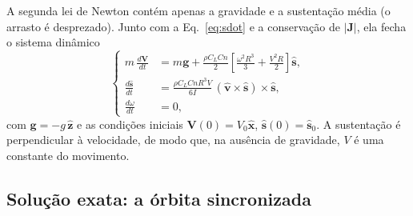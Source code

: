 \documentclass[aps,pre,twocolumn,superscriptaddress,nofootinbib,floatfix]{revtex4-2}
\newcommand{\vect}[1]{\bm{#1}}
\newcommand{\uv}[1]{\hat{\bm{#1}}}
\begin{document}
A segunda lei de Newton contém apenas a gravidade e a sustentação média (o arrasto é desprezado). Junto com a Eq.~\eqref{eq:sdot} e a conservação de $|\vect J|$, ela fecha o sistema dinâmico
\begin{equation}
  \left\{
  \begin{aligned}
    m\,\frac{d\vect V}{dt} &= m\vect g + \frac{\rho C_LCn}{2}\left[\frac{\omega^2R^3}{3}+\frac{V^2R}{2}\right]\uv s,\\
    \frac{d\uv s}{dt} &= \frac{\rho C_LCnR^3V}{6I}\,(\uv v\times\uv s)\times\uv s,\\
    \frac{d\omega}{dt} &= 0,
  \end{aligned}
  \right.
  \label{eq:eom}
\end{equation}
com $\vect g=-g\,\uv z$ e as condições iniciais $\vect V(0)=V_0\uv x$, $\uv s(0)=\uv s_0$. A sustentação é perpendicular à velocidade, de modo que, na ausência de gravidade, $V$ é uma constante do movimento.

\subsection{Solução exata: a órbita sincronizada}
\end{document}
